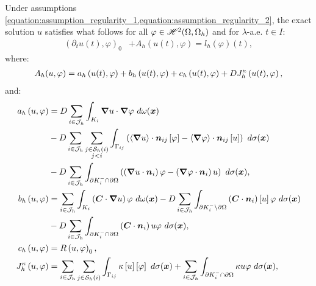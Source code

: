 Under assumptions \cref{equation:assumption_regularity_1,equation:assumption_regularity_2}, the exact solution $u$ satisfies what follows for all $\varphi \in \mathscr{H}^{2}(\Omega, \Omega_h)$ and for $\lambda$-a.e. $t \in I$:
\begin{align}
    \left( \partial_t u(t), \varphi \right)_0 &+ A_h(u(t), \varphi) = l_h \left( \varphi \right) (t),
\end{align}
where:
\begin{gather}
    A_h(u, \varphi) = a_h \left( u(t), \varphi \right) + b_h \left( u(t), \varphi \right) + c_h \left( u(t), \varphi \right) + D J^{\kappa}_h \left( u(t), \varphi \right) \label{equation:cdr_Ah},
\end{gather}
and:
\begin{align}
    a_h \left( u, \varphi \right) &= \Diffusion \sum_{i \in \SpaceIndices} \int_{K_i} \Gradient u \cdot \Gradient \varphi ~ d \omega(\Vector{x}) \label{equation:cdr_ah} \\
    &- \Diffusion \sum_{i \in \SpaceIndices} \sum_{\substack{j \in \Neighbours{i} \\ j < i}} \int_{\Gamma_{ij}} \left( \left\langle \Gradient u \right\rangle \cdot \Vector{n}_{ij} \left[ \varphi \right] - \left\langle \Gradient \varphi \right\rangle \cdot \Vector{n}_{ij} \left[ u \right] \right) ~ d \sigma(\Vector{x}) \notag \\
    &- \Diffusion \sum_{i \in \SpaceIndices} \int_{\partial K_i^- \cap \partial \Omega} \left( \left( \Gradient u \cdot \Vector{n}_i \right) \varphi - \left( \Gradient \varphi \cdot \Vector{n}_i \right) u \right) ~ d \sigma(\Vector{x}), \notag \\
    b_h \left( u, \varphi \right) &= \sum_{i \in \SpaceIndices} \int_{K_i} \left( \Convection \cdot \Gradient u \right) \varphi ~ d \omega(\Vector{x}) \label{equation:cdr_bh} - \Diffusion \sum_{i \in \SpaceIndices} \int_{\partial K_i^- \setminus \partial \Omega} \left( \Convection \cdot \Vector{n}_i \right) \left[ u \right] \varphi ~ d \sigma(\Vector{x}) \\
    &- \Diffusion \sum_{i \in \SpaceIndices} \int_{\partial K_i^- \cap \partial \Omega} \left( \Convection \cdot \Vector{n}_i \right) u \varphi ~ d \sigma(\Vector{x}), \notag \\
    c_h \left( u, \varphi \right) &= \Reaction \left( u, \varphi \right)_0, \label{equation:cdr_ch} \\
    J^{\kappa}_h \left( u, \varphi \right) &= \sum_{i \in \SpaceIndices} \sum_{j \in \Neighbours{i}} \int_{\Gamma_{ij}} \kappa \left[ u \right] \left[ \varphi \right] ~ d \sigma(\Vector{x}) + \sum_{i \in \SpaceIndices} \int_{\partial K_i^- \cap \partial \Omega} \kappa u \varphi ~ d \sigma(\Vector{x}), \label{equation:cdr_jh} \\

\end{align}
